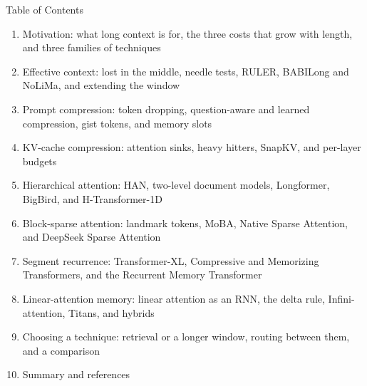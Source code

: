 \begin{frame}{Table of Contents}
  \begin{enumerate}\itemsep0.1em\footnotesize
    \item Motivation: what long context is for, the three costs that grow with length, and three families of techniques
    \item Effective context: lost in the middle, needle tests, RULER, BABILong and NoLiMa, and extending the window
    \item Prompt compression: token dropping, question-aware and learned compression, gist tokens, and memory slots
    \item KV-cache compression: attention sinks, heavy hitters, SnapKV, and per-layer budgets
    \item Hierarchical attention: HAN, two-level document models, Longformer, BigBird, and H-Transformer-1D
    \item Block-sparse attention: landmark tokens, MoBA, Native Sparse Attention, and DeepSeek Sparse Attention
    \item Segment recurrence: Transformer-XL, Compressive and Memorizing Transformers, and the Recurrent Memory Transformer
    \item Linear-attention memory: linear attention as an RNN, the delta rule, Infini-attention, Titans, and hybrids
    \item Choosing a technique: retrieval or a longer window, routing between them, and a comparison
    \item Summary and references
  \end{enumerate}
\end{frame}

